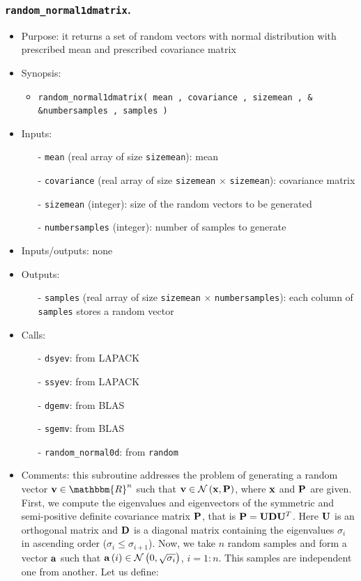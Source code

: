 \documentclass[12pt]{article}
\begin{document}
\subsubsection{{\tt random\_normal1dmatrix}.}
\begin{itemize}
\item Purpose: it returns a set of random vectors with normal distribution with prescribed mean and prescribed covariance matrix 
\item Synopsis: 
\begin{itemize}
\item {\tt random\_normal1dmatrix( mean , covariance , sizemean , \& \\ \&numbersamples , samples )}
\end{itemize}
\item Inputs: 
\begin{itemize}
\item[-] {\tt mean} (real array of size {\tt sizemean}): mean
\item[-] {\tt covariance} (real array of size {\tt sizemean} $\times$ {\tt sizemean}): covariance matrix
\item[-] {\tt sizemean} (integer): size of the random vectors to be generated
\item[-] {\tt numbersamples} (integer): number of samples to generate
\end{itemize}
\item Inputs/outputs: none
\item Outputs:
\begin{itemize}
\item[-] {\tt samples} (real array of size {\tt sizemean} $\times$ {\tt numbersamples}): each column of {\tt samples} stores a random vector
\end{itemize}
\item Calls: 
\begin{itemize}
\item[-] {\tt dsyev}: from LAPACK
\item[-] {\tt ssyev}: from LAPACK
\item[-] {\tt dgemv}: from BLAS
\item[-] {\tt sgemv}: from BLAS
\item[-] {\tt random\_normal0d}: from {\tt random}
\end{itemize}
\item Comments: this subroutine addresses the problem of generating a random vector ${\bf v} \in \mathbbm{R}^n$ such that ${\bf v} \in \mathcal{N} \left( {\bf x} , {\bf P} \right)$, where ${\bf x}$ and ${\bf P}$ are given. First, we compute the eigenvalues and eigenvectors of the symmetric and semi-positive definite covariance matrix ${\bf P}$, that is ${\bf P} = {\bf U} {\bf D} {\bf U}^T$. Here ${\bf U}$ is an orthogonal matrix and ${\bf D}$ is a diagonal matrix containing the eigenvalues $\sigma_i$ in ascending order ($\sigma_i \leq \sigma_{i+1}$). Now, we take $n$ random samples and form a vector ${\bf a}$ such that ${\bf a} \left( i \right) \in \mathcal{N} \left( 0 , \sqrt{ \sigma_i } \right)$, $i = 1 : n$. This samples are independent one from another. Let us define:

\end{itemize}
\end{document}
